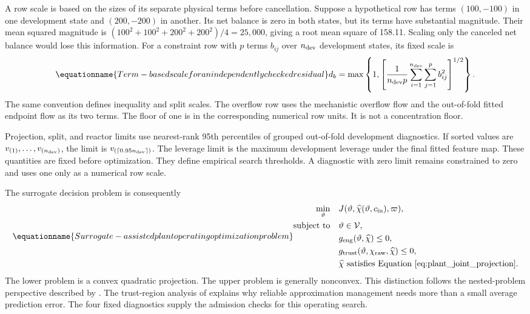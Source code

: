A row scale is based on the sizes of its separate physical terms before cancellation. Suppose a hypothetical row has terms $(100,-100)$ in one development state and $(200,-200)$ in another. Its net balance is zero in both states, but its terms have substantial magnitude. Their mean squared magnitude is $(100^2+100^2+200^2+200^2)/4=25{,}000$, giving a root mean square of 158.11. Scaling only the canceled net balance would lose this information. For a constraint row with $p$ terms $b_{ij}$ over $n_{\rm dev}$ development states, its fixed scale is
\begin{equation}
\equationname{Term-based scale for an independently checked residual}
d_b=\max\left\{1,\left[\frac1{n_{\rm dev}p}
\sum_{i=1}^{n_{\rm dev}}\sum_{j=1}^{p}b_{ij}^2\right]^{1/2}\right\}.
\label{eq:plant_term_scales}
\end{equation}
The same convention defines inequality and split scales. The overflow row uses the mechanistic overflow flow and the out-of-fold fitted endpoint flow as its two terms. The floor of one is in the corresponding numerical row units. It is not a concentration floor.

Projection, split, and reactor limits use nearest-rank 95th percentiles of grouped out-of-fold development diagnostics. If sorted values are $v_{(1)},\ldots,v_{(n_{\rm dev})}$, the limit is $v_{(\lceil0.95n_{\rm dev}\rceil)}$. The leverage limit is the maximum development leverage under the final fitted feature map. These quantities are fixed before optimization. They define empirical search thresholds. A diagnostic with zero limit remains constrained to zero and uses one only as a numerical row scale.

The surrogate decision problem is consequently
\begin{equation}
\equationname{Surrogate-assisted plant operating optimization problem}
\begin{aligned}
\min_{\vartheta}\quad&J(\vartheta,\widehat\chi(\vartheta,c_{\rm in}),\varpi),\\
\text{subject to}\quad&\vartheta\in\mathcal V,\\
&g_{\rm eng}(\vartheta,\widehat\chi)\le0,\\
&g_{\rm trust}(\vartheta,\chi_{\rm raw},\widehat\chi)\le0,\\
&\widehat\chi\text{ satisfies Equation~\eqref{eq:plant_joint_projection}}.
\end{aligned}
\label{eq:plant_surrogate_optimization}
\end{equation}
The lower problem is a convex quadratic projection. The upper problem is generally nonconvex. This distinction follows the nested-problem perspective described by \citet{Colson2007}. The trust-region analysis of \citet{Alexandrov1998} explains why reliable approximation management needs more than a small average prediction error. The four fixed diagnostics supply the admission checks for this operating search.


